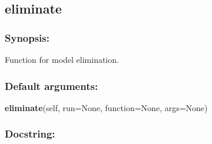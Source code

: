 \newpage

\subsection{eliminate}


\subsubsection{Synopsis:}

Function for model elimination.

\subsubsection{Default arguments:}

\textsf{\textbf{eliminate}(self, run=None, function=None, args=None)
}


\subsubsection{Docstring:}

